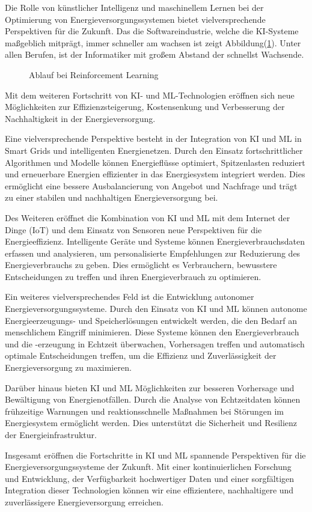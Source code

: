Die Rolle von künstlicher Intelligenz und maschinellem Lernen bei der
Optimierung von Energieversorgungssystemen bietet vielversprechende
Perspektiven für die Zukunft. Das die Softwareindustrie, welche die KI-Systeme
maßgeblich mitprägt, immer schneller am wachsen ist zeigt
Abbildung(\ref{fig:wachstumsberufe}). Unter allen Berufen, ist der Informatiker
mit großem Abstand der schnellst Wachsende.
\begin{figure}[!h]
    \centering
    
    \caption[width=0.4\textwidth]{Ablauf bei Reinforcement Learning}
    \label{fig:wachstumsberufe}
\end{figure}
\cite{eichhorst2015zukunft}

Mit dem weiteren Fortschritt von KI- und ML-Technologien eröffnen sich neue
Möglichkeiten zur Effizienzsteigerung, Kostensenkung und Verbesserung der
Nachhaltigkeit in der Energieversorgung.

Eine vielversprechende Perspektive besteht in der Integration von KI und ML in
Smart Grids und intelligenten Energienetzen. Durch den Einsatz
fortschrittlicher Algorithmen und Modelle können Energieflüsse optimiert,
Spitzenlasten reduziert und erneuerbare Energien effizienter in das
Energiesystem integriert werden. Dies ermöglicht eine bessere Ausbalancierung
von Angebot und Nachfrage und trägt zu einer stabilen und nachhaltigen
Energieversorgung bei.

Des Weiteren eröffnet die Kombination von KI und ML mit dem Internet der Dinge
(IoT) und dem Einsatz von Sensoren neue Perspektiven für die Energieeffizienz.
Intelligente Geräte und Systeme können Energieverbrauchsdaten erfassen und
analysieren, um personalisierte Empfehlungen zur Reduzierung des
Energieverbrauchs zu geben. Dies ermöglicht es Verbrauchern, bewusstere
Entscheidungen zu treffen und ihren Energieverbrauch zu optimieren.

Ein weiteres vielversprechendes Feld ist die Entwicklung autonomer
Energieversorgungssysteme. Durch den Einsatz von KI und ML können autonome
Energieerzeugungs- und Speicherlösungen entwickelt werden, die den Bedarf an
menschlichem Eingriff minimieren. Diese Systeme können den Energieverbrauch und
die -erzeugung in Echtzeit überwachen, Vorhersagen treffen und automatisch
optimale Entscheidungen treffen, um die Effizienz und Zuverlässigkeit der
Energieversorgung zu maximieren.

Darüber hinaus bieten KI und ML Möglichkeiten zur besseren Vorhersage und
Bewältigung von Energienotfällen. Durch die Analyse von Echtzeitdaten können
frühzeitige Warnungen und reaktionsschnelle Maßnahmen bei Störungen im
Energiesystem ermöglicht werden. Dies unterstützt die Sicherheit und Resilienz
der Energieinfrastruktur.

Insgesamt eröffnen die Fortschritte in KI und ML spannende Perspektiven für die
Energieversorgungssysteme der Zukunft. Mit einer kontinuierlichen Forschung und
Entwicklung, der Verfügbarkeit hochwertiger Daten und einer sorgfältigen
Integration dieser Technologien können wir eine effizientere, nachhaltigere und
zuverlässigere Energieversorgung erreichen.